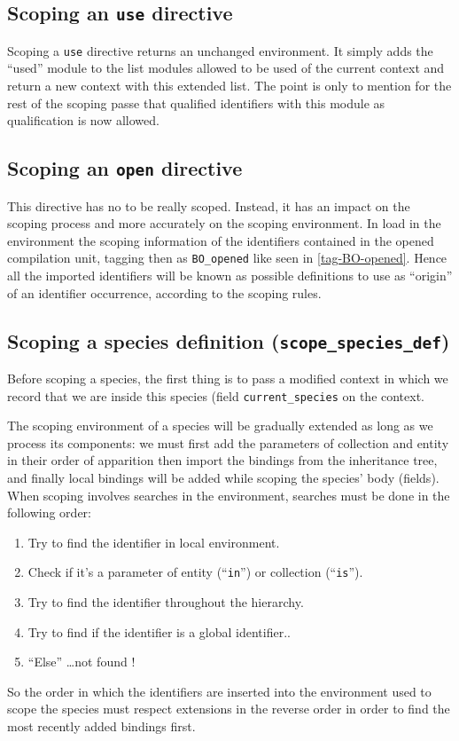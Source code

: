 \subsection{Scoping an {\tt use} directive}
Scoping a {\tt use} directive returns an unchanged environment.
It simply adds the ``used'' module to the list modules allowed to be
used of the current context and return a new context with this
extended list. The point is only to mention for the rest of the
scoping passe that qualified identifiers with this module as
qualification is now allowed.


\subsection{Scoping an {\tt open} directive}
\label{scoping-open-directive}
This directive has no to be really scoped. Instead, it has an impact
on the scoping process and more accurately on the scoping environment.
In load in the environment the scoping information of the identifiers
contained in the opened compilation unit, tagging then as
{\tt BO\_opened} like seen in \ref{tag-BO-opened}. Hence all the
imported identifiers will be known as possible definitions to use as
``origin'' of an identifier occurrence, according to the scoping
rules.


\subsection{Scoping a species definition ({\tt scope\_species\_def})}
Before scoping a species, the first thing is to pass a modified
context in which we record that we are inside this species (field
{\tt current\_species} on the context.

The scoping environment of a species will be gradually extended as
long as we process its components: we must first add the parameters of
collection and entity in their order of apparition then import the
bindings from the inheritance tree, and finally local bindings will be
added while scoping the species' body (fields). When scoping involves
searches in the environment, searches must be done in the following
order:
\begin{enumerate}
\item Try to find the identifier in local environment.
\item Check if it's a parameter of entity (``{\tt in}'') or collection
  (``{\tt is}'').
\item Try to find the identifier throughout the hierarchy.
\item Try to find if the identifier is a global identifier..
\item ``Else'' \ldots not found !
\end{enumerate}
So the order in which the identifiers are inserted into the
environment used to scope the species must respect extensions in the
reverse order in order to find the most recently added bindings first.


